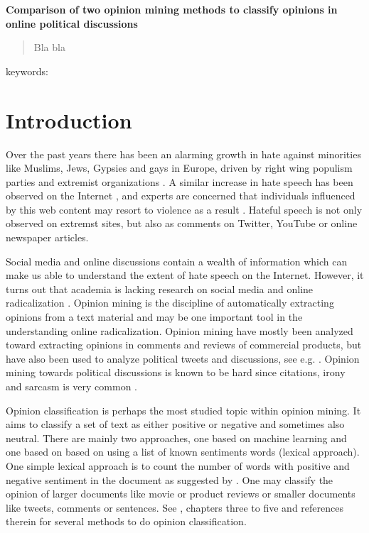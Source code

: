 \documentclass[a4paper, 12pt]{article}
\begin{document}
\begin{center}
  \textbf{\Large{Comparison of two opinion mining methods to classify opinions in online political discussions}}

\vspace{5mm}

\end{center}

\begin{abstract}
Bla bla
\end{abstract}

keywords: \textit{}

\section{Introduction}
\label{sec:introduction}

Over the past years there has been an alarming growth in hate against minorities like Muslims, Jews, Gypsies and gays in Europe, driven by right wing populism parties and extremist organizations \citep{r4, r11}. A similar increase in hate speech has been observed on the Internet \citep{r6, s2}, and experts are concerned that individuals influenced by this web content may resort to violence as a result \citep{Strommen12, Sunde13}. Hateful speech is not only observed on extremst sites, but also as comments on Twitter, YouTube or online newspaper articles.  

Social media and online discussions contain a wealth of information which can make us able to understand the extent of hate speech on the Internet. However, it turns out that academia is lacking research on social media and online radicalization \citep{s1}. Opinion mining is the discipline of automatically extracting opinions from a text material and may be one important tool in the understanding online radicalization. Opinion mining have mostly been analyzed toward extracting opinions in comments and reviews of commercial products, but have also been used to analyze political tweets and discussions, see e.g.  \citet{Tumasjan2010, Chen10}. Opinion mining towards political discussions is known to be hard since citations, irony and sarcasm is very common \citep{Bing12}.

Opinion classification is perhaps the most studied topic within opinion mining. It aims to classify a set of text as either positive or negative and sometimes also neutral. There are mainly two approaches, one based on machine learning and one based on based on using a list of known sentiments words (lexical approach). One simple lexical approach is to count the number of words with positive and negative sentiment in the document as suggested by \citet{Hu04}. One may classify the opinion of larger documents like movie or product reviews or smaller documents like tweets, comments or sentences. See \citet{Bing12}, chapters three to five and references therein for several methods to do opinion classification. 
\end{document}
